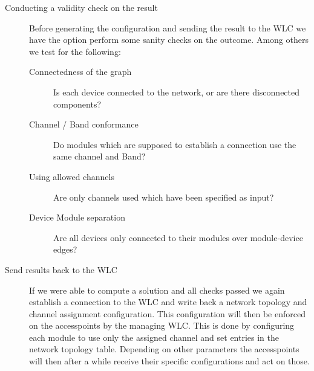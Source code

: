 \begin{description}
      \item[Conducting a validity check on the result]
	Before generating the configuration and sending the result to the WLC we have the option perform some sanity checks on the outcome.
	Among others we test for the following:
	  \begin{description}
	  \item [Connectedness of the graph]
	    Is each device connected to the network, or are there disconnected components?
	  \item [Channel / Band conformance]
	    Do modules which are supposed to establish a connection use the same channel and Band?
	  \item [Using allowed channels]
	    Are only channels used which have been specified as input?
	  \item [Device Module separation]
	    Are all devices only connected to their modules over module-device edges?
	  \end{description}
      \item [Send results back to the WLC]
	If we were able to compute a solution and all checks passed we again establish a connection to the WLC and write back a network topology and channel assignment
	configuration. This configuration will then be enforced on the accesspoints by the managing WLC.
	This is done by configuring each module to use only the assigned channel and set entries in the network topology table. Depending on other parameters the
	accesspoints will then after a while receive their specific configurations and act on those.
    \end{description}
    
